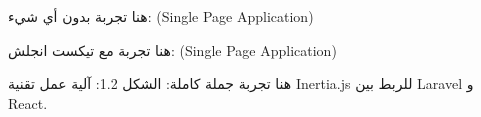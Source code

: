\documentclass{article}
\begin{document}
هنا تجربة بدون أي شيء: (Single Page Application)

هنا تجربة مع تيكست انجلش: (\textenglish{Single Page Application})

هنا تجربة جملة كاملة:
الشكل 1.2: آلية عمل تقنية Inertia.js للربط بين Laravel و React.
\end{document}
